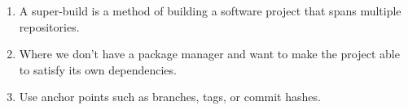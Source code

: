 

\begin{enumerate}
\item 
A super-build is a method of building a software project that spans multiple repositories.

\item
Where we don't have a package manager and want to make the project able to satisfy its own dependencies.

\item 
Use anchor points such as branches, tags, or commit hashes.
\end{enumerate}